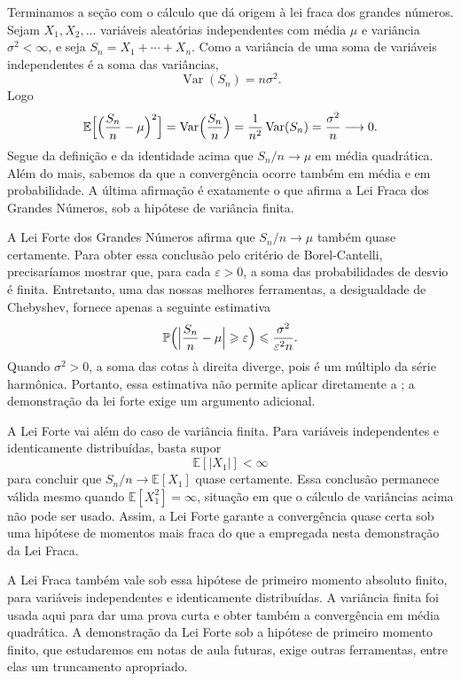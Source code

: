 \documentclass[12pt,portuguese]{article}
\theoremstyle{definition}
\theoremstyle{plainexercise}
\theoremstyle{starredexercise}
\theoremstyle{definition}
\begin{document}
Terminamos a seção com o cálculo que dá origem à lei fraca dos grandes números.
Sejam $X_1,X_2,\ldots$ variáveis aleatórias independentes com média $\mu$ e
variância $\sigma^2<\infty$, e seja $S_n=X_1+\cdots+X_n$. Como a variância de
uma soma de variáveis independentes é a soma das variâncias,
\[
\operatorname{Var}(S_n)=n\sigma^2.
\]
Logo
\[
\mathbb{E}\Bigl[\Bigl(\frac{S_n}{n}-\mu\Bigr)^2\Bigr]
=
\operatorname{Var}\Bigl(\frac{S_n}{n}\Bigr)
=
\frac{1}{n^2}\operatorname{Var}(S_n)
=
\frac{\sigma^2}{n}\longrightarrow0.
\]
Segue da definição e da identidade acima que $S_n/n\to\mu$ em média quadrática. 
Além do mais, sabemos da  que a convergência ocorre
também em média e em probabilidade. A última afirmação 
é exatamente o que afirma a Lei Fraca dos Grandes Números, sob a hipótese de
variância finita.

A Lei Forte dos Grandes Números afirma que $S_n/n\to\mu$ também quase
certamente. Para obter essa conclusão pelo critério de Borel-Cantelli,
precisaríamos mostrar que, para cada $\varepsilon>0$, a soma das
probabilidades de desvio é finita. 
Entretanto, uma das nossas melhores ferramentas, a desigualdade de Chebyshev,
fornece apenas a seguinte estimativa
\[
\mathbb{P}\Bigl(\Bigl|\frac{S_n}{n}-\mu\Bigr|\geqslant\varepsilon\Bigr)
\leqslant
\frac{\sigma^2}{\varepsilon^2 n}.
\]
Quando $\sigma^2>0$, a soma das cotas à direita diverge, pois é um múltiplo da
série harmônica. Portanto, essa estimativa não permite aplicar diretamente a
; a demonstração da lei forte exige um argumento
adicional.

A Lei Forte vai além do caso de variância finita. Para variáveis independentes
e identicamente distribuídas, basta supor
\[
\mathbb{E}[|X_1|]<\infty
\]
para concluir que $S_n/n\to\mathbb{E}[X_1]$ quase certamente. Essa conclusão
permanece válida mesmo quando $\mathbb{E}[X_1^2]=\infty$, situação em que o
cálculo de variâncias acima não pode ser usado. Assim, a Lei Forte garante a
convergência quase certa sob uma hipótese de momentos mais fraca do que a
empregada nesta demonstração da Lei Fraca.

A Lei Fraca também vale sob essa hipótese de primeiro momento absoluto finito,
para variáveis independentes e identicamente distribuídas. A variância finita
foi usada aqui para dar uma prova curta e obter também a convergência em média
quadrática. A demonstração da Lei Forte sob a hipótese de primeiro momento
finito, que estudaremos em notas de aula futuras, exige outras ferramentas,
entre elas um truncamento apropriado.
\end{document}
